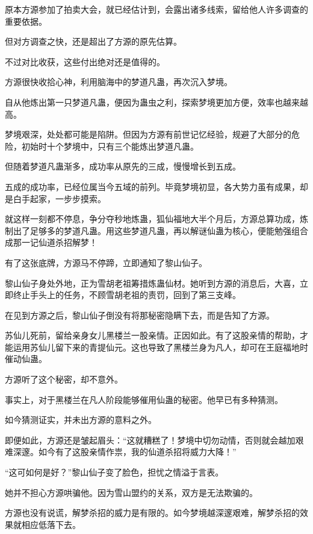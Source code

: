 
\begin{this_body}

原本方源参加了拍卖大会，就已经估计到，会露出诸多线索，留给他人许多调查的重要依据。

但对方调查之快，还是超出了方源的原先估算。

不过对比收获，这些付出绝对还是值得的。

方源很快收拾心神，利用脑海中的梦道凡蛊，再次沉入梦境。

自从他炼出第一只梦道凡蛊，便因为蛊虫之利，探索梦境更加方便，效率也越来越高。

梦境艰深，处处都可能是陷阱。但因为方源有前世记忆经验，规避了大部分的危险，初始时十个梦境中，只有三个能炼出梦道凡蛊。

但随着梦道凡蛊渐多，成功率从原先的三成，慢慢增长到五成。

五成的成功率，已经位属当今五域的前列。毕竟梦境初显，各大势力虽有成果，却是白手起家，一步步摸索。

就这样一刻都不停息，争分夺秒地炼蛊，狐仙福地大半个月后，方源总算功成，炼制出了足够多的梦道凡蛊。用这些梦道凡蛊，再以解谜仙蛊为核心，便能勉强组合成那一记仙道杀招解梦！

有了这张底牌，方源马不停蹄，立即通知了黎山仙子。

黎山仙子身处外地，正为雪胡老祖筹措炼蛊仙材。她听到方源的消息后，大喜，立即终止手头上的任务，不顾雪胡老祖的责罚，回到了第三支峰。

在见到方源之后，黎山仙子倒没有将那秘密隐瞒下去，而是告知了方源。

苏仙儿死前，留给亲身女儿黑楼兰一股亲情。正因如此。有了这股亲情的帮助，才能运用苏仙儿留下来的青提仙元。这也导致了黑楼兰身为凡人，却可在王庭福地时催动仙蛊。

方源听了这个秘密，却不意外。

事实上，对于黑楼兰在凡人阶段能够催用仙蛊的秘密。他早已有多种猜测。

如今猜测证实，并未出方源的意料之外。

即便如此，方源还是皱起眉头：“这就糟糕了！梦境中切勿动情，否则就会越加艰难深邃。如今有了这股亲情作祟，我的仙道杀招将威力大降！”

“这可如何是好？”黎山仙子变了脸色，担忧之情溢于言表。

她并不担心方源哄骗他。因为雪山盟约的关系，双方是无法欺骗的。

方源也没有说谎，解梦杀招的威力是有限的。如今梦境越深邃艰难，解梦杀招的效果就相应低落下去。


\end{this_body}
